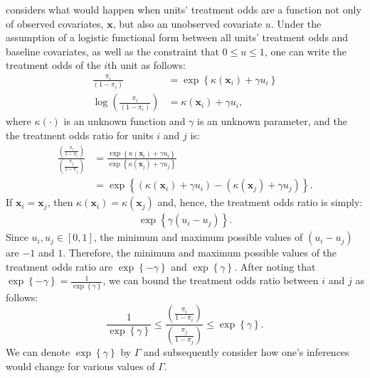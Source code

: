 \documentclass[12pt,leqno]{article}
\theoremstyle{newstyle}
\begin{document}
\citet{rosenbaum2002observational} considers what would happen when units' treatment odds are a function not only of observed covariates, $\mathbf{x}$, but also an unobserved covariate $u$. Under the assumption of a logistic functional form between all units' treatment odds and baseline covariates, as well as the constraint that $0 \leq u \leq 1$, one can write the treatment odds of the $i$th unit as follows:
\begin{align*}
\frac{\pi_i}{\left(1 - \pi_i\right)} & = \exp\left\{\kappa\left(\mathbf{x}_i\right) + \gamma u_i\right\} \\ 
\log\left(\frac{\pi_i}{\left(1 - \pi_i\right)}\right) & = \kappa\left(\mathbf{x}_i\right) + \gamma u_i,
\end{align*}
where $\kappa\left(\cdot\right)$ is an unknown function and $\gamma$ is an unknown parameter, and the the treatment odds ratio for units $i$ and $j$ is:
\begin{align*}
\frac{\left(\frac{\pi_i}{1 - \pi_i}\right)}{\left(\frac{\pi_j}{1 - \pi_j}\right)} & = \frac{\exp\left\{\kappa\left(\mathbf{x}_i\right) + \gamma u_i\right\}}{\exp\left\{\kappa\left(\mathbf{x}_j\right) + \gamma u_j\right\}} \\
& = \exp\left\{\left(\kappa\left(\mathbf{x}_i\right) + \gamma u_i\right) - \left(\kappa\left(\mathbf{x}_j\right) + \gamma u_j\right)\right\}.
\end{align*}
If $\mathbf{x}_i = \mathbf{x}_j$, then $\kappa\left(\mathbf{x}_i\right) = \kappa\left(\mathbf{x}_j\right)$ and, hence, the treatment odds ratio is simply:
\begin{align*}
\exp\left\{\gamma \left(u_i -  u_j\right)\right\}.
\end{align*}
Since $u_i, u_j \in \left[0, 1\right]$, the minimum and maximum possible values of $\left(u_i -  u_j\right)$ are $-1$ and $1$. Therefore, the minimum and maximum possible values of the treatment odds ratio are $\exp\left\{-\gamma\right\}$ and $\exp\left\{\gamma\right\}$. After noting that $\exp\left\{-\gamma\right\} = \frac{1}{\exp\left\{\gamma\right\}}$, we can bound the treatment odds ratio between $i$ and $j$ as follows:
\begin{equation}
\frac{1}{\exp\left\{\gamma\right\}} \leq \frac{\left(\frac{\pi_i}{1 - \pi_i}\right)}{\left(\frac{\pi_j}{1 - \pi_j}\right)} \leq \exp\left\{\gamma\right\}.
\end{equation}
We can denote $\exp\left\{\gamma\right\}$ by $\Gamma$ and subsequently consider how one's inferences would change for various values of $\Gamma$.
\end{document}
